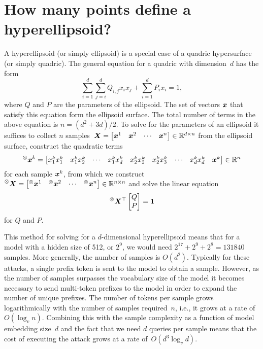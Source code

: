 \documentclass{article}
\begin{document}
\section{How many points define a hyperellipsoid?}
A hyperellipsoid (or simply ellipsoid) is a special case of a quadric hypersurface\footnotemark{} (or simply quadric).
The general equation for a quadric with dimension~\(d\) has the form 
\[\sum_{i=1}^d\sum_{j=i}^dQ_{i,j}x_ix_j + \sum_{i=1}^dP_ix_i=1,\]
where \(Q\) and \(P\) are the parameters of the ellipsoid.
The set of vectors \({\bm{x}}\) that satisfy this equation form the ellipsoid surface.
The total number of terms in the above equation is \(n=(d^2+3d)/2\).
To solve for the parameters of an ellipsoid 
it suffices to collect \(n\) samples~\(
{\bm{X}}=\begin{bmatrix}
{\bm{x}}^1&{\bm{x}}^2&\cdots&{\bm{x}}^n
\end{bmatrix}\in\mathbb{R}^{d\times n}
\) from the ellipsoid surface,
construct the quadratic terms 
\[
  \prescript{\otimes}{}{\bm{x}}^k = \begin{bmatrix}
  x^k_1x^k_1 & x^k_1x^k_2 & \cdots & x^k_1x^k_d & x^k_2x^k_2 & x^k_2x^k_3 & \cdots & x^k_dx^k_d & {\bm{x}}^k
\end{bmatrix}\in\mathbb{R}^n
\] for each sample \({\bm{x}}^k\), 
from which we construct \(\prescript\otimes{}{\bm{X}}=\begin{bmatrix}
  \prescript\otimes{}{\bm{x}}^1&\prescript\otimes{}{\bm{x}}^2&\cdots&\prescript\otimes{}{\bm{x}}^n
\end{bmatrix}\in\mathbb{R}^{n\times n}
\)
and solve the linear equation
\[
  \prescript\otimes{}{\bm{X}}^\top\begin{bmatrix}
    Q \\ P
  \end{bmatrix} 
  = \mathbf1 
\]
for \(Q\) and \(P\).\footnotemark{}

This method for solving for a \(d\)-dimensional hyperellipsoid means that for a model with a hidden size of 512, or \(2^9\), 
we would need \(2^{17} + 2^9 + 2^8=\num{131 840}\) samples. 
More generally, the number of samples is \(O(d^2)\).
Typically for these attacks, a single prefix token is sent to the model to obtain a sample. 
However, as the number of samples surpasses the vocabulary size of the model it becomes necessary to send multi-token prefixes to the model in order to expand the number of unique prefixes.
The number of tokens per sample grows logarithmically with the number of samples required~\(n\), i.e., it grows at a rate of \(O(\log_vn)\). 
Combining this with the sample complexity as a function of model embedding size~\(d\) and the fact that we need \(d\) queries per sample means that 
the cost of executing the attack grows at a rate of~\(O(d^3\log_vd)\).
\end{document}
